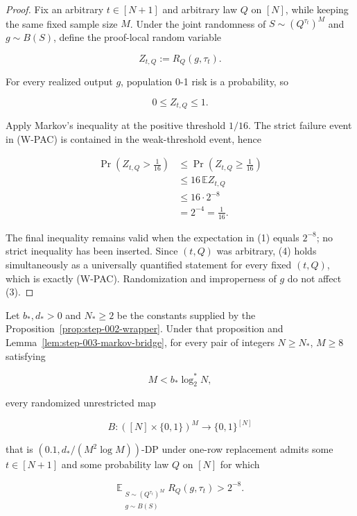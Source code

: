 \begin{proof}
Fix an arbitrary \(t\in[N+1]\) and arbitrary law \(Q\) on \([N]\), while
keeping the same fixed sample size \(M\). Under the joint randomness of
\(S\sim(Q^{\tau_t})^M\) and \(g\sim B(S)\), define the proof-local random
variable

\[
Z_{t,Q}:=R_Q(g,\tau_t).
\]

For every realized output \(g\), population 0-1 risk is a probability, so

\[
0\le Z_{t,Q}\le1.
\tag{3}
\]

Apply Markov's inequality at the positive threshold \(1/16\). The strict
failure event in (W-PAC) is contained in the weak-threshold event, hence

\[
\begin{aligned}
\Pr\!\left(Z_{t,Q}>\frac1{16}\right)
&\le \Pr\!\left(Z_{t,Q}\ge\frac1{16}\right)\\
&\le 16\,\mathbb E Z_{t,Q}\\
&\le 16\cdot2^{-8}\\
&=2^{-4}
=\frac1{16}.
\end{aligned}
\tag{4}
\]

The final inequality remains valid when the expectation in (1) equals
\(2^{-8}\); no strict inequality has been inserted. Since \((t,Q)\) was
arbitrary, (4) holds simultaneously as a universally quantified statement
for every fixed \((t,Q)\), which is exactly (W-PAC). Randomization and
improperness of \(g\) do not affect (3). \end{proof}

\begin{proposition}\label{prop:step-003-expected-hardness}
Let \(b_*,d_*>0\) and \(N_*\ge2\) be the constants supplied by the Proposition~\ref{prop:step-002-wrapper}. Under that proposition and
Lemma~\ref{lem:step-003-markov-bridge}, for every pair of integers
\(N\ge N_*\), \(M\ge8\) satisfying

\[
M<b_*\log_2^*N,
\]

every randomized unrestricted map

\[
B:([N]\times\{0,1\})^M\to\{0,1\}^{[N]}
\]

that is
\(\left(0.1,d_*/(M^2\log M)\right)\)-DP under one-row replacement admits
some \(t\in[N+1]\) and some probability law \(Q\) on \([N]\) for which

\[
\mathbb E_{\substack{S\sim(Q^{\tau_t})^M\\g\sim B(S)}}
  R_Q(g,\tau_t)
>2^{-8}.
\tag{5}
\]
\end{proposition}

